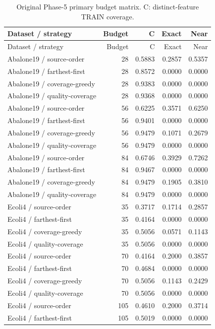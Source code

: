\begin{longtable}{lrrrr}
\caption{Original Phase-5 primary budget matrix. C: distinct-feature TRAIN coverage.}\label{tab:phase5}\\
\toprule
Dataset / strategy & Budget & C & Exact & Near \\
\midrule
\endfirsthead
\toprule
Dataset / strategy & Budget & C & Exact & Near \\
\midrule
\endhead
Abalone19 / source-order & 28 & 0.5883 & 0.2857 & 0.5357 \\
Abalone19 / farthest-first & 28 & 0.8572 & 0.0000 & 0.0000 \\
Abalone19 / coverage-greedy & 28 & 0.9383 & 0.0000 & 0.0000 \\
Abalone19 / quality-coverage & 28 & 0.9368 & 0.0000 & 0.0000 \\
Abalone19 / source-order & 56 & 0.6225 & 0.3571 & 0.6250 \\
Abalone19 / farthest-first & 56 & 0.9401 & 0.0000 & 0.0000 \\
Abalone19 / coverage-greedy & 56 & 0.9479 & 0.1071 & 0.2679 \\
Abalone19 / quality-coverage & 56 & 0.9479 & 0.0000 & 0.0000 \\
Abalone19 / source-order & 84 & 0.6746 & 0.3929 & 0.7262 \\
Abalone19 / farthest-first & 84 & 0.9467 & 0.0000 & 0.0000 \\
Abalone19 / coverage-greedy & 84 & 0.9479 & 0.1905 & 0.3810 \\
Abalone19 / quality-coverage & 84 & 0.9479 & 0.0000 & 0.0000 \\
Ecoli4 / source-order & 35 & 0.3717 & 0.1714 & 0.2857 \\
Ecoli4 / farthest-first & 35 & 0.4164 & 0.0000 & 0.0000 \\
Ecoli4 / coverage-greedy & 35 & 0.5056 & 0.0571 & 0.1143 \\
Ecoli4 / quality-coverage & 35 & 0.5056 & 0.0000 & 0.0000 \\
Ecoli4 / source-order & 70 & 0.4164 & 0.2000 & 0.3857 \\
Ecoli4 / farthest-first & 70 & 0.4684 & 0.0000 & 0.0000 \\
Ecoli4 / coverage-greedy & 70 & 0.5056 & 0.1143 & 0.2429 \\
Ecoli4 / quality-coverage & 70 & 0.5056 & 0.0000 & 0.0000 \\
Ecoli4 / source-order & 105 & 0.4610 & 0.2000 & 0.3714 \\
Ecoli4 / farthest-first & 105 & 0.5019 & 0.0000 & 0.0000 \\

\end{longtable}
